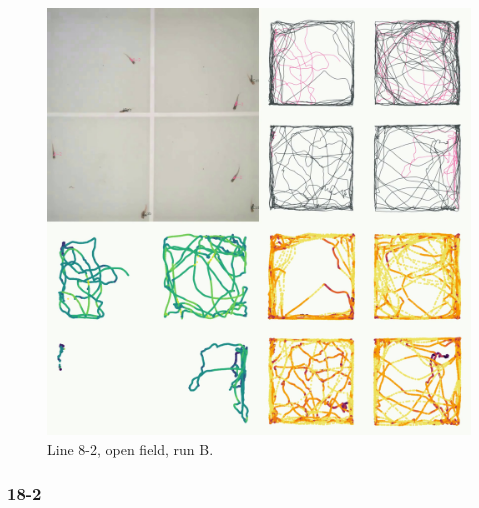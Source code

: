 \documentclass[
]{book}
\begin{document}
\begin{figure}
\includegraphics[width=1\linewidth]{figs/mikk_behaviour/four_panel_plots/open_field_20191118_1224_8-2_R_B_300} \caption{Line 8-2, open field, run B.}\label{fig:4p-8-2-of-B}
\end{figure}

\hypertarget{section-2}{%
\subsubsection{18-2}\label{section-2}}
\end{document}
